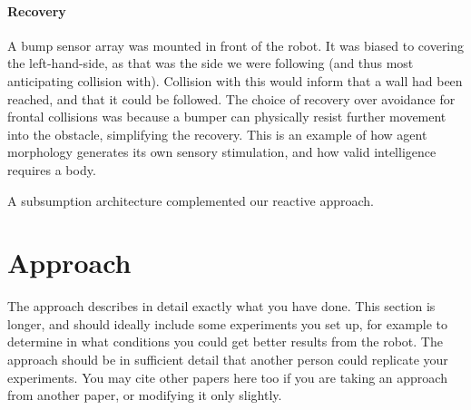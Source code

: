 \documentclass[a4paper,12pt]{article}
\begin{document}
\paragraph{Recovery} A bump sensor array was mounted in front of the robot. It was biased to covering the left-hand-side, as that was the side we were following (and thus most anticipating collision with). Collision with this would inform that a wall had been reached, and that it could be followed. The choice of recovery over avoidance for frontal collisions was because a bumper can physically resist further movement into the obstacle, simplifying the recovery. This is an example of how agent morphology generates its own sensory stimulation\cite{pfeifer2005morphological}, and how valid intelligence requires a body\cite{brooks1991intelligence,pfeifer2005morphological}.

A subsumption architecture\cite{brooks1991intelligence} complemented our reactive approach. 

\section{Approach}

The approach describes in detail exactly what you have done.  This
section is longer, and should ideally include some experiments you set
up, for example to determine in what conditions you could get better
results from the robot.  The approach should be in sufficient detail
that another person could replicate your experiments.  You may cite
other papers here too if you are taking an approach from another
paper, or modifying it only slightly.
\end{document}
